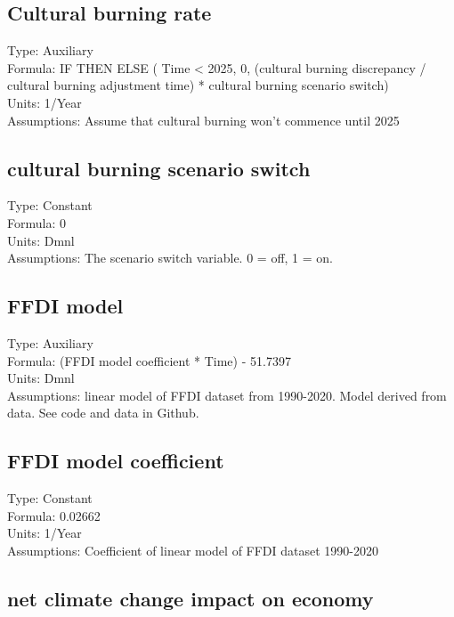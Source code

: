 \documentclass[
  11pt,
]{book}
\begin{document}
\hypertarget{cultural-burning-rate}{%
\subsection{Cultural burning rate}\label{cultural-burning-rate}}

Type: Auxiliary\\
Formula: IF THEN ELSE ( Time \textless{} 2025, 0, (cultural burning discrepancy / cultural burning adjustment time) * cultural burning scenario switch)\\
Units: 1/Year\\
Assumptions: Assume that cultural burning won't commence until 2025

\hypertarget{cultural-burning-scenario-switch}{%
\subsection{cultural burning scenario switch}\label{cultural-burning-scenario-switch}}

Type: Constant\\
Formula: 0\\
Units: Dmnl\\
Assumptions: The scenario switch variable. 0 = off, 1 = on.

\hypertarget{ffdi-model}{%
\subsection{FFDI model}\label{ffdi-model}}

Type: Auxiliary\\
Formula: (FFDI model coefficient * Time) - 51.7397\\
Units: Dmnl\\
Assumptions: linear model of FFDI dataset from 1990-2020. Model derived from data. See code and data in Github.

\hypertarget{ffdi-model-coefficient}{%
\subsection{FFDI model coefficient}\label{ffdi-model-coefficient}}

Type: Constant\\
Formula: 0.02662\\
Units: 1/Year\\
Assumptions: Coefficient of linear model of FFDI dataset 1990-2020

\hypertarget{net-climate-change-impact-on-economy}{%
\subsection{net climate change impact on economy}\label{net-climate-change-impact-on-economy}}
\end{document}
